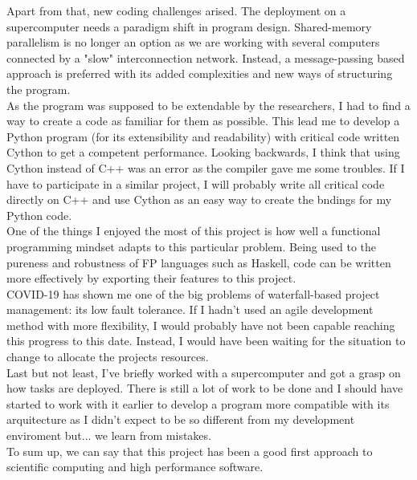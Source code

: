 \documentclass{tfg_domingo}
\begin{document}
  Apart from that, new coding challenges arised. The deployment on a
  supercomputer needs a paradigm shift in program design. Shared-memory
  parallelism is no longer an option as we are working with several computers
  connected by a "slow" interconnection network. Instead, a message-passing
  based approach is preferred with its added complexities and new ways of
  structuring the program.\\

  As the program was supposed to be extendable by the researchers, I had to
  find a way to create a code as familiar for them as possible. This lead me to
  develop a Python program (for its extensibility and readability) with
  critical code written Cython to get a competent performance. Looking
  backwards, I think that using Cython instead of C++ was an error as the
  compiler gave me some troubles. If I have to participate in a similar project,
  I will probably write all critical code directly on C++ and use Cython as
  an easy way to create the bndings for my Python code.\\

  One of the things I enjoyed the most of this project is how well a
  functional programming mindset adapts to this particular problem. Being
  used to the pureness and robustness of FP languages such as Haskell,
  code can be written more effectively by exporting their features to this
  project.\\

  COVID-19 has shown me one of the big problems of waterfall-based project
  management: its low fault tolerance. If I hadn't used an agile development
  method with more flexibility, I would probably have not been capable reaching
  this progress to this date. Instead, I would have been waiting for the
  situation to change to allocate the projects resources.\\

  Last but not least, I've briefly worked with a supercomputer and got a grasp
  on how tasks are deployed. There is still a lot of work to be done and I
  should have started to work with it earlier to develop a program more
  compatible with its arquitecture as I didn't expect to be so different from
  my development enviroment but... we learn from mistakes. \\

  To sum up, we can say that this project has been a good first approach to
  scientific computing and high performance software.\\




\backmatter

\end{document}
